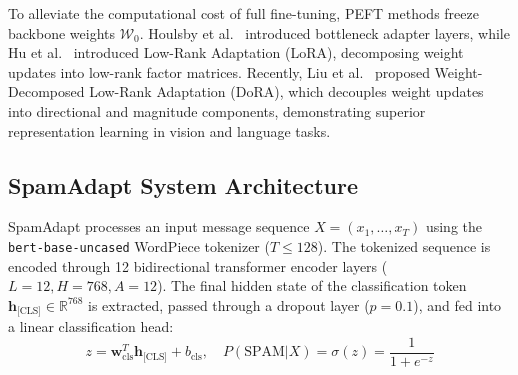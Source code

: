 \documentclass[conference]{IEEEtran}
\begin{document}
To alleviate the computational cost of full fine-tuning, PEFT methods freeze backbone weights $\mathcal{W}_0$. Houlsby et al.~\cite{houlsby2019adapter} introduced bottleneck adapter layers, while Hu et al.~\cite{hu2022lora} introduced Low-Rank Adaptation (LoRA), decomposing weight updates into low-rank factor matrices. Recently, Liu et al.~\cite{liu2024dora} proposed Weight-Decomposed Low-Rank Adaptation (DoRA), which decouples weight updates into directional and magnitude components, demonstrating superior representation learning in vision and language tasks.

\subsection{SpamAdapt System Architecture}
SpamAdapt processes an input message sequence $X = (x_1, \dots, x_T)$ using the \texttt{bert-base-uncased} WordPiece tokenizer ($T \le 128$). The tokenized sequence is encoded through 12 bidirectional transformer encoder layers ($L=12, H=768, A=12$). The final hidden state of the classification token $\mathbf{h}_{\text{[CLS]}} \in \mathbb{R}^{768}$ is extracted, passed through a dropout layer ($p=0.1$), and fed into a linear classification head:
\begin{equation}
    z = \mathbf{w}_{\text{cls}}^T \mathbf{h}_{\text{[CLS]}} + b_{\text{cls}}, \quad P(\text{SPAM}|X) = \sigma(z) = \frac{1}{1 + e^{-z}}
    \label{eq:sigmoid}
\end{equation}
\end{document}
